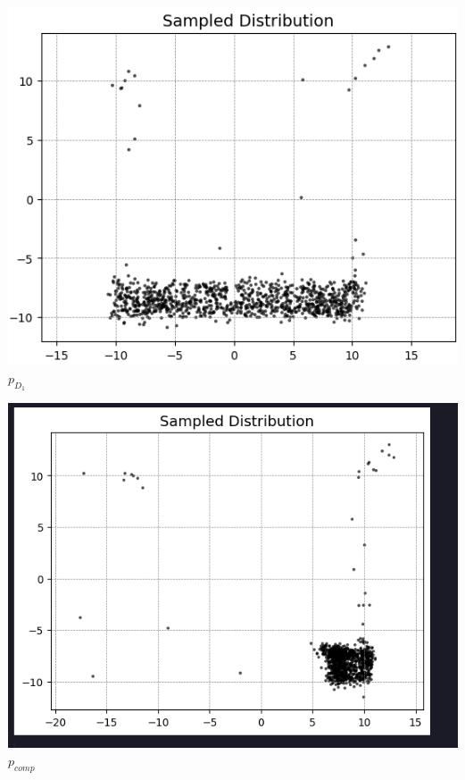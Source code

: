 \documentclass{article}
\begin{document}
\begin{center}
  \begin{minipage}{0.4\textwidth}
    \includegraphics[width=\linewidth]{images_guidance1/conditionedononerectangle.png}
    \centering\small $p_{D_1}$
  \end{minipage}
  \hfill
  \begin{minipage}{0.4\textwidth}
    \includegraphics[width=\linewidth]{images_guidance1/productofconditioningontworectangles.png}
    \centering\small $p_{comp}$
  \end{minipage}
  \hfill
  \end{center}
\end{document}
